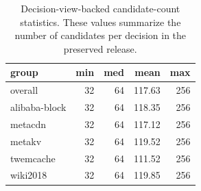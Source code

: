 \begin{table}[H]
  \centering
  \footnotesize
  \caption{Decision-view-backed candidate-count statistics. These values summarize the number of candidates per decision in the preserved release.}
  \label{tab:candidate-count-stats}
  \begin{tabular}{@{}lrrrr@{}}
    \toprule
    group & min & med & mean & max \\
    \midrule
    overall & 32 & 64 & 117.63 & 256 \\
    alibaba-block & 32 & 64 & 118.35 & 256 \\
    metacdn & 32 & 64 & 117.12 & 256 \\
    metakv & 32 & 64 & 119.52 & 256 \\
    twemcache & 32 & 64 & 111.52 & 256 \\
    wiki2018 & 32 & 64 & 119.85 & 256 \\
    \bottomrule
  \end{tabular}
\end{table}
